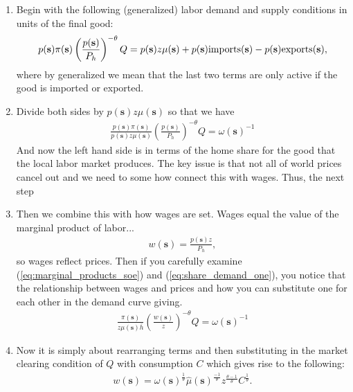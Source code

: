 \documentclass[pdftex,12pt]{article}
\begin{document}
\begin{enumerate}
\item Begin with the following (generalized) labor demand and supply conditions in units of the final good:
    \begin{align}
p(\textbf{s})\pi(\textbf{s}) \left(\frac{p(\textbf{s})}{P_h}\right)^{-\theta}Q=  p(\textbf{s}) z\mu(\textbf{s}) + p(\textbf{s})\mbox{\normalfont imports}(\textbf{s}) - p(\textbf{s})\mbox{\normalfont exports(\textbf{s})} ,
    \end{align}
where by generalized we mean that the last two terms are only active if the good is imported or exported.

\item Divide both sides by $p(\textbf{s})z\mu(\textbf{s})$ so that we have
    \begin{align}
\frac{p(\textbf{s})\pi(\textbf{s})}{p(\textbf{s})z\mu(\textbf{s})}  \left(\frac{p(\textbf{s})}{P_h}\right)^{-\theta}Q=  \omega(\textbf{s})^{-1}
\label{eq:share_demand_one}
    \end{align}
And now the left hand side is in terms of the home share for the good that the local labor market produces. The key issue is that not all of world prices cancel out and we need to some how connect this with wages. Thus, the next step

\item Then we combine this with how wages are set. Wages equal the value of the marginal product of labor...
\begin{align}
w(\textbf{s}) = \frac{p(\textbf{s}) z}{P_h},
\label{eq:marginal_products_soe}
\end{align}
so wages reflect prices. Then if you carefully examine (\ref{eq:marginal_products_soe}) and (\ref{eq:share_demand_one}), you notice that the relationship between wages and prices and how you can substitute one for each other in the demand curve giving.
\begin{align}
\frac{\pi(\textbf{s})}{z\mu(\textbf{s})\bar{h}}  \left(\frac{w(\textbf{s})}{z}\right)^{-\theta}Q=  \omega(\textbf{s})^{-1}
\end{align}

\item Now it is simply about rearranging terms and then substituting in the market clearing condition of $Q$ with consumption $C$ which gives rise to the following:
\begin{align}
 w(\textbf{s}) = \omega(\textbf{s})^{\frac{1}{\theta}} \hat \mu( \textbf{s})^{\frac{-1}{\theta}}z^{\frac{\theta-1}{\theta}} C^{\frac{1}{\theta}}.
\end{align}
\end{enumerate}
\end{document}
